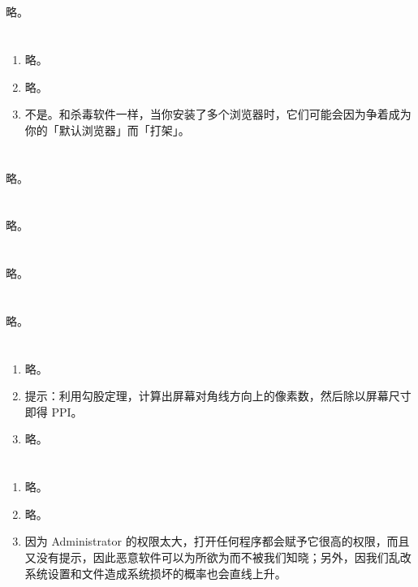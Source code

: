 \section{}

略。

\section{}

\begin{enumerate}
  \item 略。
  \item 略。
  \item 不是。和杀毒软件一样，当你安装了多个浏览器时，它们可能会因为争着成为你的「默认浏览器」而「打架」。
\end{enumerate}

\section{}

略。

\section{}

略。

\section{}

略。

\section{}

略。

\section{}

\begin{enumerate}
  \item 略。
  \item 提示：利用勾股定理，计算出屏幕对角线方向上的像素数，然后除以屏幕尺寸即得 PPI。
  \item 略。
\end{enumerate}

\section{}

\begin{enumerate}
  \item 略。
  \item 略。
  \item 因为 Administrator 的权限太大，打开任何程序都会赋予它很高的权限，而且又没有提示，因此恶意软件可以为所欲为而不被我们知晓；另外，因我们乱改系统设置和文件造成系统损坏的概率也会直线上升。
\end{enumerate}